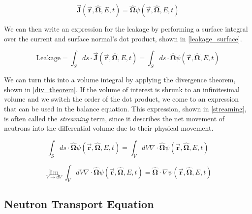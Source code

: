 \begin{equation}
\label{current}
\vec{\boldsymbol{J}}(\boldsymbol{\vec{r}},\boldsymbol{\hat{\Omega}},E,t) =  \boldsymbol{\hat{\Omega}} \psi(\boldsymbol{\vec{r}},\boldsymbol{\hat{\Omega}},E,t)
\end{equation}

We can then write an expression for the leakage by performing a surface integral over the current and surface normal's dot product, shown in \eqref{leakage_surface}.

\begin{equation}
\label{leakage_surface}
\mathrm{Leakage} = \int_S ds \cdot  \vec{\boldsymbol{J}}(\boldsymbol{\vec{r}},\boldsymbol{\hat{\Omega}},E,t) = \int_S ds \cdot  \boldsymbol{\hat{\Omega}} \psi(\boldsymbol{\vec{r}},\boldsymbol{\hat{\Omega}},E,t)
\end{equation}
 
 We can turn this into a volume integral by applying the divergence theorem, shown in \eqref{div_theorem}.  If the volume of interest is shrunk to an infinitesimal volume and we switch the order of the dot product, we come to an expression that can be used in the balance equation.  This expression, shown in \eqref{streaming}, is often called the \emph{streaming} term, since it describes the net movement of neutrons into the differential volume due to their physical movement.
 
\begin{equation}
\label{div_theorem}
\int_S ds \cdot \boldsymbol{\hat{\Omega}} \psi(\boldsymbol{\vec{r}},\boldsymbol{\hat{\Omega}},E,t) = \int_V dV \nabla \cdot \boldsymbol{\hat{\Omega}}  \psi(\boldsymbol{\vec{r}},\boldsymbol{\hat{\Omega}},E,t)
\end{equation}

\begin{equation}
\label{streaming}
 \lim_{V\to dV} \int_V dV \nabla \cdot \boldsymbol{\hat{\Omega}}  \psi(\boldsymbol{\vec{r}},\boldsymbol{\hat{\Omega}},E,t) =  \boldsymbol{\hat{\Omega}}  \cdot \nabla\psi(\boldsymbol{\vec{r}},\boldsymbol{\hat{\Omega}},E,t) 
 \end{equation}
 

\subsection{Neutron Transport Equation}

